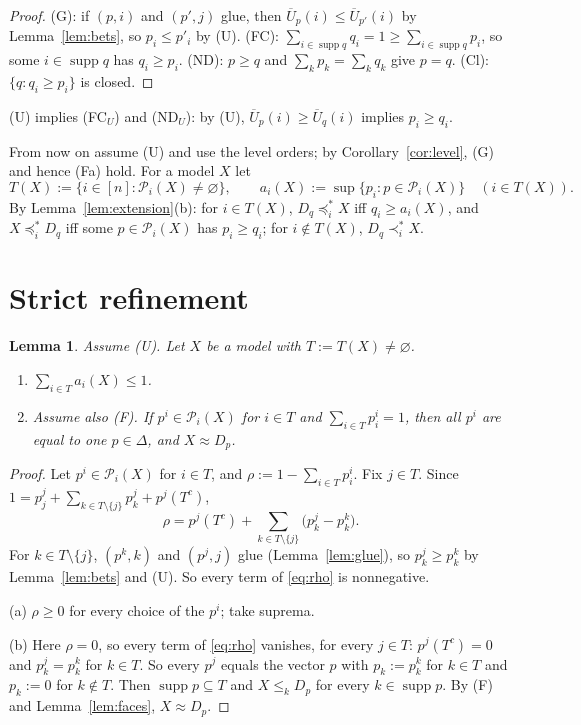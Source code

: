 \documentclass[11pt]{article}
\newtheorem{lemma}[theorem]{Lemma}
\theoremstyle{definition}
\newcommand{\supp}{\operatorname{supp}}
\newcommand{\Pc}{\mathcal P}
\newcommand{\Ub}{\overline U}
\newcommand{\ws}{\preceq^{*}}
\newcommand{\wss}{\prec^{*}}
\begin{document}
\begin{proof}
(G): if $(p,i)$ and $(p',j)$ glue, then $\Ub_p(i)\le\Ub_{p'}(i)$ by Lemma~\ref{lem:bets}, so $p_i\le p'_i$ by (U). (FC): $\sum_{i\in\supp q}q_i=1\ge\sum_{i\in\supp q}p_i$, so some $i\in\supp q$ has $q_i\ge p_i$. (ND): $p\ge q$ and $\sum_kp_k=\sum_kq_k$ give $p=q$. (Cl): $\{q:q_i\ge p_i\}$ is closed.
\end{proof}

(U) implies (FC$_U$) and (ND$_U$): by (U), $\Ub_p(i)\ge\Ub_q(i)$ implies $p_i\ge q_i$.

From now on assume (U) and use the level orders; by Corollary~\ref{cor:level}, (G) and hence (Fa) hold. For a model $X$ let
\[
T(X):=\{i\in[n]:\Pc_i(X)\ne\varnothing\},\qquad a_i(X):=\sup\{p_i:p\in\Pc_i(X)\}\quad(i\in T(X)).
\]
By Lemma~\ref{lem:extension}(b): for $i\in T(X)$, $D_q\ws_iX$ iff $q_i\ge a_i(X)$, and $X\ws_iD_q$ iff some $p\in\Pc_i(X)$ has $p_i\ge q_i$; for $i\notin T(X)$, $D_q\wss_iX$.

\section{Strict refinement}\label{sec:strict}

\begin{lemma}\label{lem:budget}
Assume (U). Let $X$ be a model with $T:=T(X)\ne\varnothing$.
\begin{enumerate}[label=(\alph*)]
\item $\sum_{i\in T}a_i(X)\le1$.
\item Assume also (F). If $p^i\in\Pc_i(X)$ for $i\in T$ and $\sum_{i\in T}p^i_i=1$, then all $p^i$ are equal to one $p\in\Delta$, and $X\approx D_p$.
\end{enumerate}
\end{lemma}

\begin{proof}
Let $p^i\in\Pc_i(X)$ for $i\in T$, and $\rho:=1-\sum_{i\in T}p^i_i$. Fix $j\in T$. Since $1=p^j_j+\sum_{k\in T\setminus\{j\}}p^j_k+p^j(T^c)$,
\begin{equation}\label{eq:rho}
\rho=p^j(T^c)+\sum_{k\in T\setminus\{j\}}\big(p^j_k-p^k_k\big).
\end{equation}
For $k\in T\setminus\{j\}$, $(p^k,k)$ and $(p^j,j)$ glue (Lemma~\ref{lem:glue}), so $p^j_k\ge p^k_k$ by Lemma~\ref{lem:bets} and (U). So every term of \eqref{eq:rho} is nonnegative.

(a) $\rho\ge0$ for every choice of the $p^i$; take suprema.

(b) Here $\rho=0$, so every term of \eqref{eq:rho} vanishes, for every $j\in T$: $p^j(T^c)=0$ and $p^j_k=p^k_k$ for $k\in T$. So every $p^j$ equals the vector $p$ with $p_k:=p^k_k$ for $k\in T$ and $p_k:=0$ for $k\notin T$. Then $\supp p\subseteq T$ and $X\le_kD_p$ for every $k\in\supp p$. By (F) and Lemma~\ref{lem:faces}, $X\approx D_p$.
\end{proof}
\end{document}

